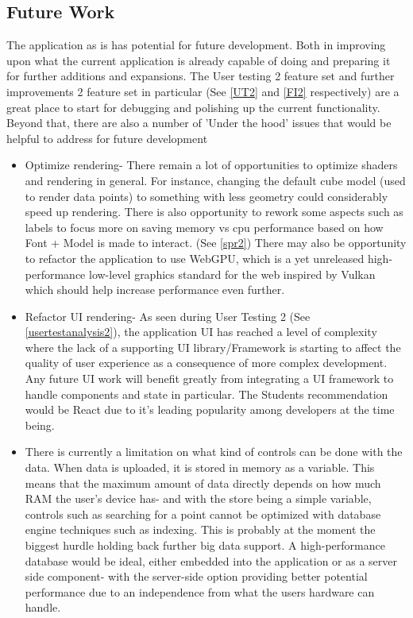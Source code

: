 \subsection{Future Work} \label{futurework}
The application as is has potential for future development. Both in improving upon what the current application is already capable of doing and preparing it for further additions and expansions. The User testing 2 feature set and further improvements 2 feature set in particular (See \ref{UT2} and \ref{FI2} respectively) are a great place to start for debugging and polishing up the current functionality. Beyond that, there are also a number of 'Under the hood' issues that would be helpful to address for future development
\begin{itemize}
    \item Optimize rendering- There remain a lot of opportunities to optimize shaders and rendering in general. For instance, changing the default cube model (used to render data points) to something with less geometry could considerably speed up rendering. There is also opportunity to rework some aspects such as labels to focus more on saving memory vs cpu performance based on how Font + Model is made to interact. (See \ref{spr2}) There may also be opportunity to refactor the application to use WebGPU, which is a yet unreleased high-performance low-level graphics standard for the web inspired by Vulkan which should help increase performance even further. \cite{w3c_2023_webgpu} \cite{mozilla_webgpu}
    \item Refactor UI rendering- As seen during User Testing 2 (See \ref{usertestanalysis2}), the application UI has reached a level of complexity where the lack of a supporting UI library/Framework is starting to affect the quality of user experience as a consequence of more complex development. Any future UI work will benefit greatly from integrating a UI framework to handle components and state in particular. The Students recommendation would be React due to it's leading popularity among developers at the time being. \cite[]{stackoverflow_2021_stack}
    \item There is currently a limitation on what kind of controls can be done with the data. When data is uploaded, it is stored in memory as a variable. This means that the maximum amount of data directly depends on how much RAM the user's device has- and with the store being a simple variable, controls such as searching for a point cannot be optimized with database engine techniques such as indexing. This is probably at the moment the biggest hurdle holding back further big data support. A high-performance database would be ideal, either embedded into the application or as a server side component- with the server-side option providing better potential performance due to an independence from what the users hardware can handle.
\end{itemize}

